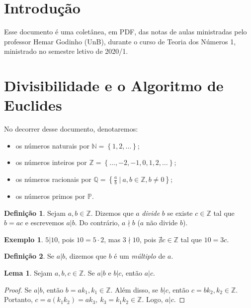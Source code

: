 \documentclass[a4paper,11pt,twoside, leqno]{article}
\theoremstyle{definition}
\newtheorem*{definition}{Definição}
\newtheorem{lemma}[theorem]{Lema}
\newtheorem*{example}{Exemplo}
\begin{document}
\newpage

\tableofcontents
\newpage
{}

\setlength{\baselineskip}{7mm}

\section{Introdução}
\hspace{12pt} Esse documento é uma coletânea, em PDF, das notas de aulas ministradas pelo professor Hemar Godinho (UnB), durante o curso de Teoria dos Números 1, ministrado no semestre letivo de 2020/1.

\section{Divisibilidade e o Algoritmo de Euclides}
\hspace{12pt} No decorrer desse documento, denotaremos:
\begin{itemize}
	\item os números naturais por $\mathbb{N} = \left\{ 1, 2, \dots \right\}$;
	\item os números inteiros por $\mathbb{Z} = \left\{\dots, -2, -1, 0, 1, 2, \dots \right\}$;
	\item os números racionais por $\mathbb{Q} = \left\{ \displaystyle{\frac{a}{b}\ \Big| \ a,b\in\mathbb{Z}}, b\neq 0 \right\}$;
	\item os números primos por $\mathbb{P}$.
\end{itemize}
\begin{definition}
	Sejam $a,b\in\mathbb{Z}$. Dizemos que $a$ {\em divide} $b$ se existe $c\in\mathbb{Z}$ tal que $b = ac$ e escrevemos $a|b$. Do contrário, $a\nmid b$ ($a$ não divide $b$).
\end{definition}
\begin{example}
	$5|10$, pois $10 = 5\cdot 2$, mas $3\nmid 10$, pois $\nexists c\in\mathbb{Z}$ tal que $10 = 3c$. 
\end{example}
\begin{definition}
	Se $a|b$, dizemos que $b$ é um {\em múltiplo} de $a$.
\end{definition}
\begin{lemma}
	\label{lema 1}
	Sejam $a,b,c\in\mathbb{Z}$. Se $a|b$ e $b|c$, então $a|c$.
\end{lemma}
\begin{proof}
	Se $a|b$, então $b = ak_1, k_1\in\mathbb{Z}$. Além disso, se $b|c$, então $c = bk_2, k_2\in\mathbb{Z}$. Portanto, $c = a(k_1k_2) = ak_3, \ k_3=k_1k_2\in\mathbb{Z}$. Logo, $a|c$.
\end{proof}
\end{document}
